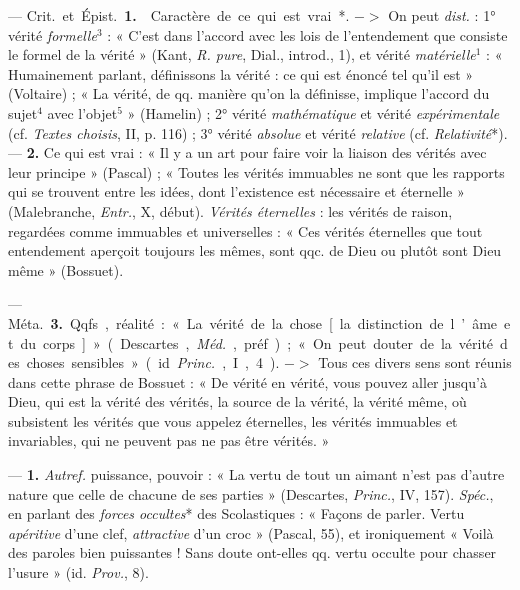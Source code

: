 \begin{itemize}[leftmargin=1cm, label=, itemsep=1pt]
 — \si{Crit.} et \si{Épist.} {\bf 1.}  Caractère de
ce qui est vrai*. $->$ On peut {\it dist.} : 1° vérité {\it formelle}$^3$ : «
C’est dans l’accord avec les lois de l’entendement que consiste le formel de
la vérité » (Kant, {\it R. pure}, Dial., introd., 1), et vérité {\it
matérielle}$^1$ : « Humainement parlant, définissons la vérité : ce qui est
énoncé tel qu'il est » (Voltaire) ; « La vérité, de qq. manière qu’on la
définisse, implique l'accord du sujet$^4$ avec l’objet$^5$ » (Hamelin) ; 2°
vérité {\it mathématique} et vérité {\it expérimentale} (cf. {\it Textes
choisis}, II, p. 116) ; 3° vérité {\it absolue} et vérité {\it relative} (cf.
{\it Relativité}*). —  {\bf 2.}  Ce qui est vrai : « Il y a un
art pour faire voir la liaison des vérités avec leur principe » (Pascal) ; «
Toutes les vérités immuables ne sont que les rapports qui se trouvent entre
les idées, dont l'existence est nécessaire et éternelle » (Malebranche,
{\it Entr.}, X, début). {\it Vérités éternelles} : les vérités de raison,
regardées comme immuables et universelles : « Ces vérités éternelles que tout
entendement aperçoit toujours les mêmes, sont qqc. de Dieu ou plutôt sont
Dieu même » (Bossuet).

— \si{Méta.}  {\bf 3.} Qqfs., réalité : « La vérité de la chose [la distinction de
l’âme et du corps] » (Descartes, \si{{\it Méd.}}, préf.) ; « On peut douter
de la vérité des choses sensibles » (id. {\it Princ.}, I, 4). $->$ Tous ces
divers sens sont réunis dans cette phrase de Bossuet : « De vérité en vérité,
vous pouvez aller jusqu'à Dieu, qui est la vérité des vérités, la source de
la vérité, la vérité même, où subsistent les vérités que vous appelez
éternelles, les vérités immuables et invariables, qui ne peuvent pas ne pas
être vérités. »

 — {\bf 1.} {\it Autref.} puissance, pouvoir : « La vertu de tout
un aimant n’est pas d’autre nature que celle de chacune de ses parties
» (Descartes, {\it Princ.}, IV, 157). {\it Spéc.}, en parlant des {\it forces
occultes}* des Scolastiques : « Façons de parler. Vertu {\it apéritive} d'une
clef, {\it attractive} d'un croc » (Pascal, 55), et ironiquement « Voilà des
paroles bien puissantes !
Sans doute ont-elles qq. vertu occulte pour chasser l'usure » (id.
{\it Prov.}, 8).


\end{itemize}
